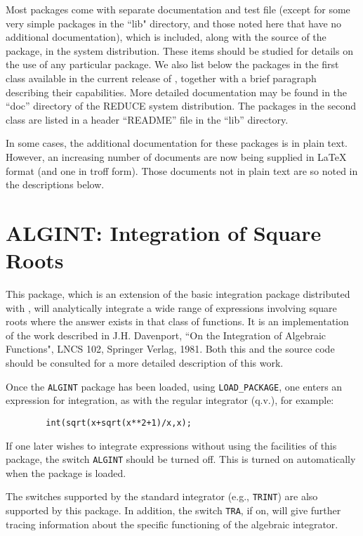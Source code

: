 Most packages come with separate documentation and test file (except for
some very simple packages in the ``lib" directory, and those noted here
that have no additional documentation), which is included, along with the
source of the package, in the {\REDUCE} system distribution.  These items
should be studied for details on the use of any particular package.  We
also list below the packages in the first class available in the current
release of {\REDUCE}, together with a brief paragraph describing their
capabilities.  More detailed documentation may be found in the ``doc''
directory of the REDUCE system distribution.  The packages in the second
class are listed in a header ``README'' file in the ``lib'' directory.

In some cases, the additional documentation for these packages is in plain
text.  However, an increasing number of documents are now being supplied
in {\LaTeX} format (and one in troff form).  Those documents not in plain
text are so noted in the descriptions below.

\section{ALGINT: Integration of Square Roots} 

This package, which is an extension of the basic integration package
distributed with {\REDUCE}, will analytically integrate a wide range of
expressions involving square roots where the answer exists in that class
of functions. It is an implementation of the work described in J.H.
Davenport, ``On the Integration of Algebraic Functions", LNCS 102,
Springer Verlag, 1981.  Both this and the source code should be consulted
for a more detailed description of this work.

Once the {\tt ALGINT} package has been loaded, using {\tt LOAD\_PACKAGE},
one enters an expression for integration, as with the regular integrator
(q.v.), for example:
\begin{verbatim}
        int(sqrt(x+sqrt(x**2+1)/x,x);
\end{verbatim}
If one later wishes to integrate expressions without using the facilities of
this package, the switch {\tt ALGINT}  should be turned
off.  This is turned on automatically when the package is loaded.

The switches supported by the standard integrator (e.g., {\tt TRINT})
 are also supported by this package.  In addition, the
switch {\tt TRA},  if on, will give further tracing
information about the specific functioning of the algebraic integrator.

